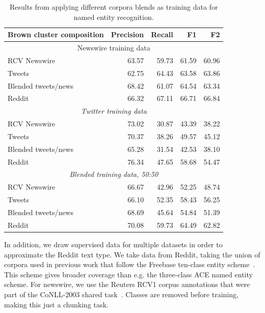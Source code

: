 \documentclass[review]{elsarticle}
\begin{document}
\begin{table}
\centering
\caption{Results from applying different corpora blends as training data for named entity recognition.}
\begin{tabular}{lrrrr}
\hline
{\bf Brown cluster composition} & {\bf Precision} & {\bf Recall} & {\bf F1} & {\bf F2} \\
\hline
\multicolumn{5}{c}{Newswire training data} \\
\hline
RCV Newswire          & 63.57 & 59.73 & 61.59 & 60.96 \\
Tweets                & 62.75 & 64.43 & 63.58 & 63.86 \\
Blended tweets/news  & 68.42 & 61.07 & 64.54 & 63.34 \\
Reddit                & 66.32 & 67.11 & 66.71 & 66.84 \\
\hline
\multicolumn{5}{c}{\emph{Twitter training data}} \\
\hline
RCV Newswire          & 73.02 & 30.87 & 43.39 & 38.22 \\
Tweets                & 70.37 & 38.26 & 49.57 & 45.12 \\
Blended tweets/news  & 65.28 & 31.54 & 42.53 & 38.10 \\
Reddit                & 76.34 & 47.65 & 58.68 & 54.47 \\
\hline
\multicolumn{5}{c}{\emph{Blended training data, 50:50}} \\
\hline
RCV Newswire          & 66.67 & 42.96 & 52.25 & 48.74 \\
Tweets                & 66.10 & 52.35 & 58.43 & 56.25 \\
Blended tweets/news  & 68.69 & 45.64 & 54.84 & 51.39 \\
Reddit                & 70.08 & 59.73 & 64.49 & 62.82 \\
\hline
\end{tabular}
\label{tab:brown-tuning}
\end{table}


In addition, we draw supervised data for multiple datasets in order to approximate the Reddit text type.
We take data from Reddit, taking the union of corpora used in previous work that follow the Freebase ten-class entity scheme~\cite{ritter2011named,baldwin2015shared}.
This scheme gives broader coverage than e.g. the three-class ACE named entity scheme.
For newswire, we use the Reuters RCV1 corpus annotations that were part of the CoNLL-2003 shared task~\cite{tjong2003introduction}.
Classes are removed before training, making this just a chunking task.
\end{document}
